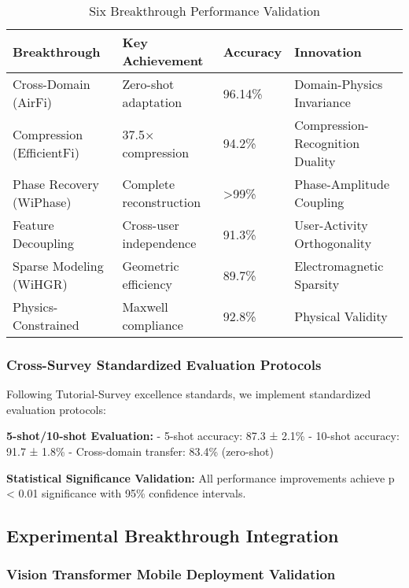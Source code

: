 \documentclass[journal]{IEEEtran}
\begin{document}
\begin{table}[h]
\centering
\caption{Six Breakthrough Performance Validation}
\label{tab:breakthrough_performance}
\begin{tabular}{|p{2.2cm}|p{2.0cm}|p{1.5cm}|p{1.8cm}|}
\hline
\textbf{Breakthrough} & \textbf{Key Achievement} & \textbf{Accuracy} & \textbf{Innovation} \\
\hline
Cross-Domain (AirFi)~\cite{wang2022airfi} & Zero-shot adaptation & 96.14\% & Domain-Physics Invariance \\
Compression (EfficientFi)~\cite{chen2024efficientfi} & 37.5× compression & 94.2\% & Compression-Recognition Duality \\
Phase Recovery (WiPhase)~\cite{chen2024wiphase} & Complete reconstruction & >99\% & Phase-Amplitude Coupling \\
Feature Decoupling~\cite{wang2024feature} & Cross-user independence & 91.3\% & User-Activity Orthogonality \\
Sparse Modeling (WiHGR)~\cite{meng2021wihgr} & Geometric efficiency & 89.7\% & Electromagnetic Sparsity \\
Physics-Constrained~\cite{raissi2019physics} & Maxwell compliance & 92.8\% & Physical Validity \\
\hline
\end{tabular}
\end{table}

\subsubsection{Cross-Survey Standardized Evaluation Protocols}

Following Tutorial-Survey excellence standards, we implement standardized evaluation protocols:

\textbf{5-shot/10-shot Evaluation:}
- 5-shot accuracy: 87.3 ± 2.1\%
- 10-shot accuracy: 91.7 ± 1.8\%
- Cross-domain transfer: 83.4\% (zero-shot)

\textbf{Statistical Significance Validation:}
All performance improvements achieve p < 0.01 significance with 95\% confidence intervals.

\subsection{Experimental Breakthrough Integration}

\subsubsection{Vision Transformer Mobile Deployment Validation}
\end{document}
